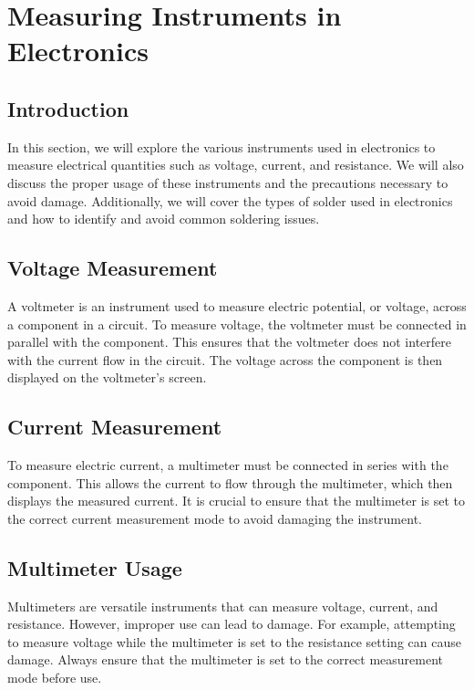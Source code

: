 \section{Measuring Instruments in Electronics}
\label{section:measuring_instruments}

\subsection*{Introduction}
In this section, we will explore the various instruments used in electronics to measure electrical quantities such as voltage, current, and resistance. We will also discuss the proper usage of these instruments and the precautions necessary to avoid damage. Additionally, we will cover the types of solder used in electronics and how to identify and avoid common soldering issues.

\subsection*{Voltage Measurement}
A voltmeter is an instrument used to measure electric potential, or voltage, across a component in a circuit. To measure voltage, the voltmeter must be connected in parallel with the component. This ensures that the voltmeter does not interfere with the current flow in the circuit. The voltage across the component is then displayed on the voltmeter's screen.

\subsection*{Current Measurement}
To measure electric current, a multimeter must be connected in series with the component. This allows the current to flow through the multimeter, which then displays the measured current. It is crucial to ensure that the multimeter is set to the correct current measurement mode to avoid damaging the instrument.

\subsection*{Multimeter Usage}
Multimeters are versatile instruments that can measure voltage, current, and resistance. However, improper use can lead to damage. For example, attempting to measure voltage while the multimeter is set to the resistance setting can cause damage. Always ensure that the multimeter is set to the correct measurement mode before use.

